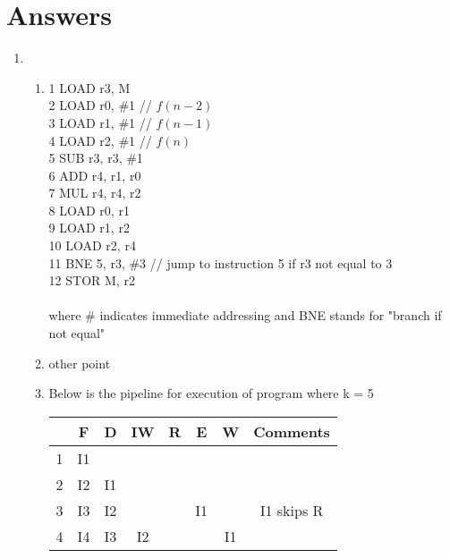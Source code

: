 \documentclass[12pt]{article}
\begin{document}
    \section*{Answers}
    \begin{enumerate}
        \item 
        \begin{enumerate}
            \item 1 LOAD r3, M\\
            2 LOAD r0, \#1  \hspace{1cm}// $f(n - 2)$\\
            3 LOAD r1, \#1 \hspace{1cm} // $f(n-1)$\\
            4 LOAD r2, \#1 \hspace{1cm} // $f(n)$\\
            5 SUB r3, r3, \#1\\
            6 ADD r4, r1, r0\\
            7 MUL r4, r4, r2\\
            8 LOAD r0, r1\\
            9 LOAD r1, r2\\
            10 LOAD r2, r4\\
            11 BNE 5, r3, \#3 \hspace{0.5cm} // jump to instruction 5 if r3 not equal to 3\\
            12 STOR M, r2\\
            \\
            where \# indicates immediate addressing and BNE stands for "branch if not equal"
            \\
            \item other point
            \clearpage
            \item Below is the pipeline for execution of program where k = 5
            \begin{table}[h!]
            \centering
            \begin{tabular}{||c||c|c|c|c|c|c|c||} 
             \hline
              & F & D & IW & R & E & W & Comments\\ [0.5ex] 
             \hline\hline
             1 & I1 & & & & & & \\ 
             2 & I2 & I1 & & & & &  \\
             3 & I3 & I2 & & & I1 & & I1 skips R\\
             4 & I4 & I3 & I2 & & & I1 & \\

\end{tabular}
\end{table}
\end{enumerate}
\end{enumerate}
\end{document}
